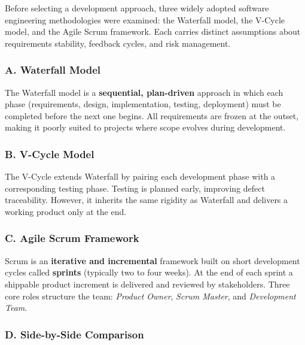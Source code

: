 Before selecting a development approach, three widely adopted software engineering
methodologies were examined: the Waterfall model, the V-Cycle model, and the Agile
Scrum framework. Each carries distinct assumptions about requirements stability, feedback
cycles, and risk management.

\subsubsection*{A. Waterfall Model}

The Waterfall model is a \textbf{sequential, plan-driven} approach in which each phase
(requirements, design, implementation, testing, deployment) must be completed before
the next one begins. All requirements are frozen at the outset, making it poorly suited
to projects where scope evolves during development.

\subsubsection*{B. V-Cycle Model}

The V-Cycle extends Waterfall by pairing each development phase with a corresponding
testing phase. Testing is planned early, improving defect traceability. However, it
inherits the same rigidity as Waterfall and delivers a working product only at the end.

\subsubsection*{C. Agile Scrum Framework}

Scrum is an \textbf{iterative and incremental} framework built on short development
cycles called \textbf{sprints} (typically two to four weeks). At the end of each sprint
a shippable product increment is delivered and reviewed by stakeholders. Three core
roles structure the team: \textit{Product Owner}, \textit{Scrum Master}, and
\textit{Development Team}.

\subsubsection*{D. Side-by-Side Comparison}

